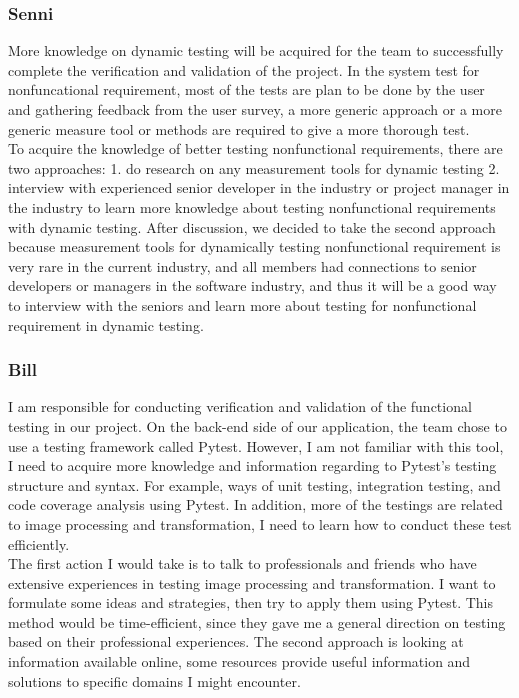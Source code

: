 \documentclass[12pt, titlepage]{article}
\begin{document}
\subsubsection{Senni}
More knowledge on dynamic testing will be acquired for the team to successfully complete the verification and validation of the project. In the system test for nonfuncational requirement, most of the tests are plan to be done by the user and gathering feedback from the user survey, a more generic approach or a more generic measure tool or methods are required to give a more thorough test.\\
\newline
To acquire the knowledge of better testing nonfunctional requirements, there are two approaches: 1. do research on any measurement tools for dynamic testing 2. interview with experienced senior developer in the industry or project manager in the industry to learn more knowledge about testing nonfunctional requirements with dynamic testing. After discussion, we decided to take the second approach because measurement tools for dynamically testing nonfunctional requirement is very rare in the current industry, and all members had connections to senior developers or managers in the software industry, and thus it will be a good way to interview with the seniors and learn more about testing for nonfunctional requirement in dynamic testing.

\subsubsection{Bill}
I am responsible for conducting verification and validation of the functional testing in our project. On the back-end side of our application, the team chose to use a testing framework called Pytest. However, I am not familiar with this tool, I need to acquire more knowledge and information regarding to Pytest's testing structure and syntax. For example, ways of unit testing, integration testing, and code coverage analysis using Pytest. In addition, more of the testings are related to image processing and transformation, I need to learn how to conduct these test efficiently.\\
\newline
The first action I would take is to talk to professionals and friends who have extensive experiences in testing image processing and transformation. I want to formulate some ideas and strategies, then try to apply them using Pytest. This method would be time-efficient, since they gave me a general direction on testing based on their professional experiences. The second approach is looking at information available online, some resources provide useful information and solutions to specific domains I might encounter.
\medskip
\end{document}
